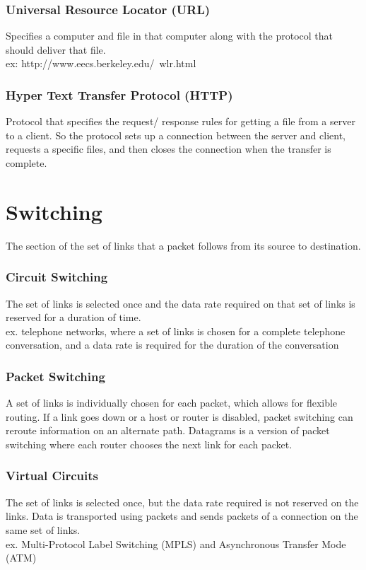 \subsubsection*{Universal Resource Locator (URL)}
Specifies a computer and file in that computer along with the protocol that should deliver that file. \\
ex: http://www.eecs.berkeley.edu/~wlr.html
\subsubsection*{Hyper Text Transfer Protocol (HTTP)}
Protocol that specifies the request/ response rules for getting a file from a server to a client. So the protocol sets up a connection between the server and client, requests a specific files, and then closes the connection when the transfer is complete. 

\section{Switching}
The section of the set of links that a packet follows from its source to destination.
\subsubsection*{Circuit Switching}
The set of links is selected once and the data rate required on that set of links is reserved for a duration of time. \\
ex. telephone networks, where a set of links is chosen for a complete telephone conversation, and a data rate is required for the duration of the conversation
\subsubsection*{Packet Switching}
A set of links is individually chosen for each packet, which allows for flexible routing. If a link goes down or a host or router is disabled, packet switching can reroute information on an alternate path. Datagrams is a version of packet switching where each router chooses the next link for each packet. 
\subsubsection*{Virtual Circuits}
The set of links is selected once, but the data rate required is not reserved on the links. Data is transported using packets and sends packets of a connection on the same set of links.\\
ex. Multi-Protocol Label Switching (MPLS) and Asynchronous Transfer Mode (ATM)

